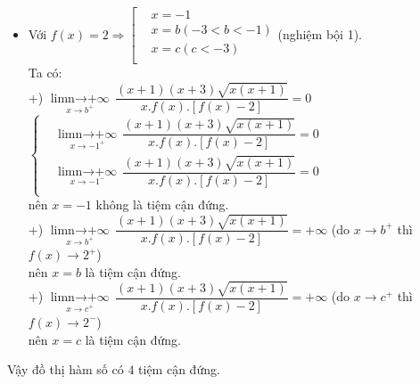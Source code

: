 \begin{ex}
{\begin{itemize}
			Ta có: $\underset{x\to -3^+}{\mathop{\lim \limits{n \to +\infty}}}\,\dfrac{\left(x+1\right)\left(x+3\right)\sqrt{x\left(x+1\right)}}{x.f\left(x\right).\left[f\left(x\right)-2\right]}=-\infty$ nên $x=-3$ là tiệm cận đứng.
			\item Với $f\left(x \right)=2\Rightarrow\left[\begin{aligned}
				& x=-1 \\ 
				& x=b\left( -3<b<-1 \right) \\ 
				& x=c\left( c<-3 \right) \\ 
			\end{aligned}\right.$(nghiệm bội 1).\\
			Ta có:\\
			+) $\underset{x\to b^+}{\mathop{\lim \limits{n \to +\infty}}}\,\dfrac{\left(x+1\right)\left(x+3 \right)\sqrt{x\left(x+1\right)}}{x.f\left(x\right).\left[f\left(x\right)-2\right]}=0$ $\left\{\begin{aligned}
				& \underset{x\to -1^+}{\mathop{\lim \limits{n \to +\infty}}}\,\dfrac{\left(x+1\right)\left(x+3 \right)\sqrt{x\left(x+1 \right)}}{x.f\left(x \right).\left[ f\left(x \right)-2\right]}=0 \\ 
				& \underset{x\to -1^-}{\mathop{\lim \limits{n \to +\infty}}}\,\dfrac{\left(x+1\right)\left(x+3\right)\sqrt{x\left(x+1\right)}}{x.f\left(x\right).\left[f\left(x \right)-2 \right]}=0 \\ 
			\end{aligned} \right.$ \\
			nên $x=-1$ không là tiệm cận đứng.\\
			+) $\underset{x\to b^+}{\mathop{\lim \limits{n \to +\infty}}}\,\dfrac{\left(x+1 \right)\left(x+3 \right)\sqrt{x\left(x+1\right)}}{x.f\left(x \right).\left[f\left(x \right)-2 \right]}=+\infty $ (do $x\to b^+$ thì $f\left(x\right)\to 2^+$) \\
			nên $x=b$ là tiệm cận đứng.\\
			+) $\underset{x\to c^+}{\mathop{\lim \limits{n \to +\infty}}}\,\dfrac{\left(x+1 \right)\left(x+3 \right)\sqrt{x\left(x+1 \right)}}{x.f\left( x \right).\left[f\left(x \right)-2 \right]}=+\infty $ (do $x\to c^+$ thì $f\left(x\right)\to 2^-$) \\
			nên $x=c$ là tiệm cận đứng.
		\end{itemize}
		Vậy đồ thị hàm số có $4$ tiệm cận đứng.}
\end{ex}

